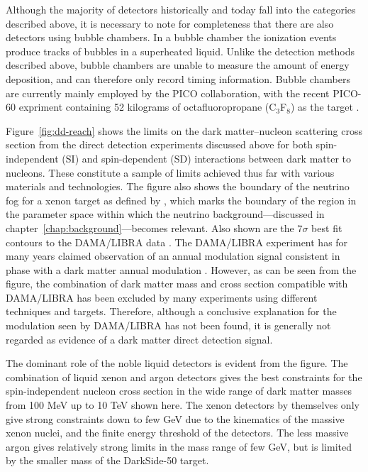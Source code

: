 Although the majority of detectors historically and today fall into the categories described above, it is necessary to note for completeness that there are also detectors using bubble chambers. In a bubble chamber the ionization events produce tracks of bubbles in a superheated liquid. Unlike the detection methods described above, bubble chambers are unable to measure the amount of energy deposition, and can therefore only record timing information. Bubble chambers are currently mainly employed by the PICO collaboration, with the recent PICO-60 expriment containing 52 kilograms of octafluoropropane (C$_3$F$_8$) as the target \parencite{PICO602019}.

Figure~\ref{fig:dd-reach} shows the limits on the dark matter--nucleon scattering cross section from the direct detection experiments discussed above for both spin-independent (SI) and spin-dependent (SD) interactions between dark matter to nucleons. These constitute a sample of limits achieved thus far with various materials and technologies. The figure also shows the boundary of the neutrino fog for a xenon target as defined by \textcite{OHare2021}, which marks the boundary of the region in the parameter space within which the neutrino background---discussed in chapter~\ref{chap:background}---becomes relevant. Also shown are the $7\sigma$ best fit contours to the DAMA/LIBRA data \parencite{SavageEtAl2009}. The DAMA/LIBRA experiment has for many years claimed observation of an annual modulation signal consistent in phase with a dark matter annual modulation \parencite{BernabeiEtAl2023}. However, as can be seen from the figure, the combination of dark matter mass and cross section compatible with DAMA/LIBRA has been excluded by many experiments using different techniques and targets. Therefore, although a conclusive explanation for the modulation seen by DAMA/LIBRA has not been found, it is generally not regarded as evidence of a dark matter direct detection signal.

The dominant role of the noble liquid detectors is evident from the figure. The combination of liquid xenon and argon detectors gives the best constraints for the spin-independent nucleon cross section in the wide range of dark matter masses from 100 MeV up to 10 TeV shown here. The xenon detectors by themselves only give strong constraints down to few GeV due to the kinematics of the massive xenon nuclei, and the finite energy threshold of the detectors. The less massive argon gives relatively strong limits in the mass range of few GeV, but is limited by the smaller mass of the DarkSide-50 target.

